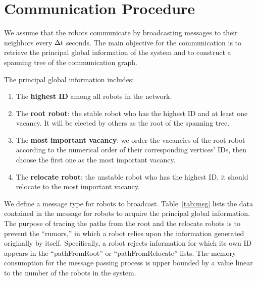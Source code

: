 \section{Communication Procedure}
\label{sec:com}
We assume that the robots communicate by broadcasting messages to their
neighbors every $\Delta t$ seconds.
%
The main objective for the communication is to retrieve the principal global
information of the system and to construct a spanning tree of the
communication graph.


The principal global information includes: 
\begin{enumerate}
\item The \textbf{highest ID} among all robots in the network.
\item The \textbf{root robot}: the stable robot who has the highest ID and at least one vacancy. 
    It will be elected by others as the root of the spanning tree.
\item The \textbf{most important vacancy}: we order the vacancies of the root robot according to the numerical order of their corresponding vertices' IDs, then choose the first one as the most important vacancy.
\item The \textbf{relocate robot}: the unstable robot who has the highest ID, it should relocate to the most important vacancy.
\end{enumerate}


We define a message type for robots to broadcast.
%
Table~\ref{tab:msg} lists the data contained in the message for robots to acquire the principal global information. 
%
The purpose of tracing the paths from the root and the relocate robots is
to prevent the ``rumors,'' in which a robot relies upon the
information generated originally by itself.  
%
Specifically, a robot
rejects information for which its own ID appears in the
``pathFromRoot'' or ``pathFromRelocate'' lists.
%
The memory consumption for the message passing process is upper bounded by a value linear to the number of the robots in the system. 

